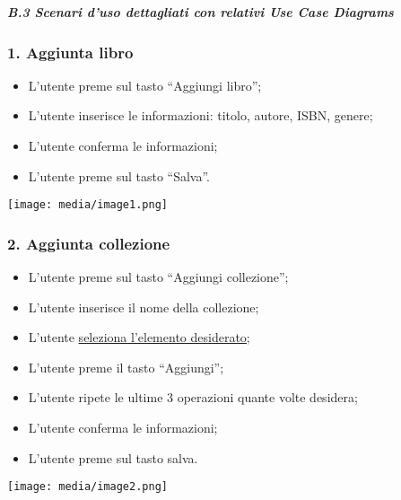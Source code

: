 \emph{\textbf{B.3 Scenari d'uso dettagliati con relativi Use Case
Diagrams}}

\subsubsection{1. Aggiunta libro}\label{aggiunta-libro}

\begin{itemize}
\item
  L'utente preme sul tasto ``Aggiungi libro'';
\item
  L'utente inserisce le informazioni: titolo, autore, ISBN, genere;
\item
  L'utente conferma le informazioni;
\item
  L'utente preme sul tasto ``Salva''.
\end{itemize}

\texttt{[image: media/image1.png]}

\subsubsection{}\label{section-2}

\subsubsection{2. Aggiunta collezione}\label{aggiunta-collezione}

\begin{itemize}
\item
  L'utente preme sul tasto ``Aggiungi collezione'';
\item
  L'utente inserisce il nome della collezione;
\item
  L'utente \ul{seleziona l'elemento desiderato;}
\item
  L'utente preme il tasto ``Aggiungi'';
\item
  L'utente ripete le ultime 3 operazioni quante volte desidera;
\item
  L'utente conferma le informazioni;
\item
  L'utente preme sul tasto salva.
\end{itemize}

\texttt{[image: media/image2.png]}

\subsubsection{}\label{section-3}

